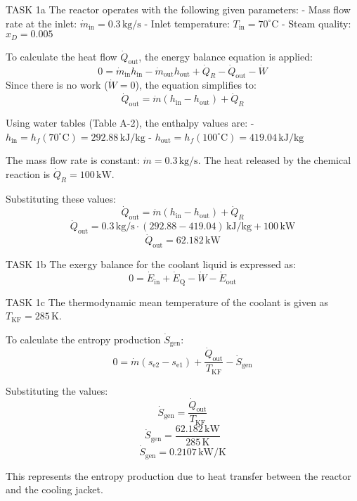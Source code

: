 TASK 1a  
The reactor operates with the following given parameters:  
- Mass flow rate at the inlet: \( \dot{m}_{\text{in}} = 0.3 \, \text{kg/s} \)  
- Inlet temperature: \( T_{\text{in}} = 70^\circ\text{C} \)  
- Steam quality: \( x_D = 0.005 \)  

To calculate the heat flow \( \dot{Q}_{\text{out}} \), the energy balance equation is applied:  
\[
0 = \dot{m}_{\text{in}} h_{\text{in}} - \dot{m}_{\text{out}} h_{\text{out}} + \dot{Q}_R - \dot{Q}_{\text{out}} - \dot{W}
\]  
Since there is no work (\( \dot{W} = 0 \)), the equation simplifies to:  
\[
\dot{Q}_{\text{out}} = \dot{m} (h_{\text{in}} - h_{\text{out}}) + \dot{Q}_R
\]  

Using water tables (Table A-2), the enthalpy values are:  
- \( h_{\text{in}} = h_f(70^\circ\text{C}) = 292.88 \, \text{kJ/kg} \)  
- \( h_{\text{out}} = h_f(100^\circ\text{C}) = 419.04 \, \text{kJ/kg} \)  

The mass flow rate is constant: \( \dot{m} = 0.3 \, \text{kg/s} \).  
The heat released by the chemical reaction is \( \dot{Q}_R = 100 \, \text{kW} \).  

Substituting these values:  
\[
\dot{Q}_{\text{out}} = \dot{m} (h_{\text{in}} - h_{\text{out}}) + \dot{Q}_R
\]  
\[
\dot{Q}_{\text{out}} = 0.3 \, \text{kg/s} \cdot (292.88 - 419.04) \, \text{kJ/kg} + 100 \, \text{kW}
\]  
\[
\dot{Q}_{\text{out}} = 62.182 \, \text{kW}
\]  

TASK 1b  
The exergy balance for the coolant liquid is expressed as:  
\[
0 = \dot{E}_{\text{in}} + \dot{E}_{\text{Q}} - \dot{W} - \dot{E}_{\text{out}}
\]  

TASK 1c  
The thermodynamic mean temperature of the coolant is given as \( T_{\text{KF}} = 285 \, \text{K} \).  

To calculate the entropy production \( \dot{S}_{\text{gen}} \):  
\[
0 = \dot{m} (s_{\text{e2}} - s_{\text{e1}}) + \frac{\dot{Q}_{\text{out}}}{T_{\text{KF}}} - \dot{S}_{\text{gen}}
\]  

Substituting the values:  
\[
\dot{S}_{\text{gen}} = \frac{\dot{Q}_{\text{out}}}{T_{\text{KF}}}
\]  
\[
\dot{S}_{\text{gen}} = \frac{62.182 \, \text{kW}}{285 \, \text{K}}
\]  
\[
\dot{S}_{\text{gen}} = 0.2107 \, \text{kW/K}
\]  

This represents the entropy production due to heat transfer between the reactor and the cooling jacket.